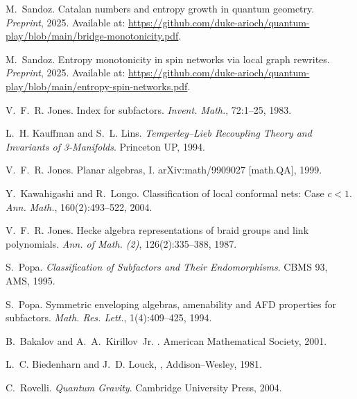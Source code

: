 \documentclass[11pt]{article}
\begin{document}

\begin{thebibliography}{9}

  M.~Sandoz.
  \newblock Catalan numbers and entropy growth in quantum geometry.
  \newblock \emph{Preprint}, 2025.
  \newblock Available at: \url{https://github.com/duke-arioch/quantum-play/blob/main/bridge-monotonicity.pdf}.

  M.~Sandoz.
  \newblock Entropy monotonicity in spin networks via local graph rewrites.
  \newblock \emph{Preprint}, 2025.
  \newblock Available at: \url{https://github.com/duke-arioch/quantum-play/blob/main/entropy-spin-networks.pdf}.

  V.~F.~R. Jones.
  \newblock Index for subfactors.
  \newblock \emph{Invent. Math.}, 72:1–25, 1983.

  L.~H. Kauffman and S.~L. Lins.
  \newblock \emph{Temperley–Lieb Recoupling Theory and Invariants of 3-Manifolds}.
  \newblock Princeton UP, 1994.

  V.~F.~R. Jones.
  \newblock Planar algebras, I.
  \newblock arXiv:math/9909027 [math.QA], 1999.

  Y.~Kawahigashi and R.~Longo.
  \newblock Classification of local conformal nets: Case $c < 1$.
  \newblock \emph{Ann. Math.}, 160(2):493--522, 2004.

  V.~F.~R. Jones.
  \newblock Hecke algebra representations of braid groups and link polynomials.
  \newblock \emph{Ann. of Math. (2)}, 126(2):335--388, 1987.

  S.~Popa.
  \newblock \emph{Classification of Subfactors and Their Endomorphisms}.
  \newblock CBMS 93, AMS, 1995.

  S.~Popa.
  \newblock Symmetric enveloping algebras, amenability and AFD properties for subfactors.
  \newblock \emph{Math. Res. Lett.}, 1(4):409--425, 1994.

  B.~Bakalov and A.~A.~Kirillov~Jr.
  .
  \newblock American Mathematical Society, 2001.

  L.~C. Biedenharn and J.~D. Louck,
  ,
  \newblock Addison–Wesley, 1981.

  C.~Rovelli.
  \newblock \emph{Quantum Gravity}.
  \newblock Cambridge University Press, 2004.


\end{thebibliography}
\end{document}
